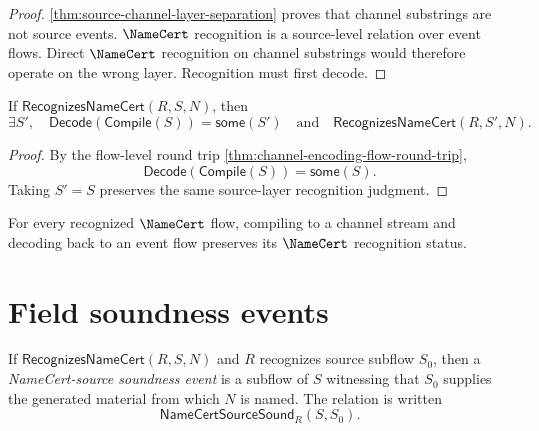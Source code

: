\begin{proof}
\autoref{thm:source-channel-layer-separation} proves that channel substrings are not source events. $\NameCert$ recognition is a source-level relation over event flows. Direct $\NameCert$ recognition on channel substrings would therefore operate on the wrong layer. Recognition must first decode.
\end{proof}

\begin{theorem}
\label{thm:namecert-generated-compilation-preserves-recognition}
If $\mathsf{RecognizesNameCert}(R,S,N)$, then
$$
  \exists S',\quad
  \mathsf{Decode}(\mathsf{Compile}(S)) = \mathsf{some}(S')
  \quad\text{and}\quad
  \mathsf{RecognizesNameCert}(R,S',N).
$$
\end{theorem}

\begin{proof}
By the flow-level round trip \autoref{thm:channel-encoding-flow-round-trip},
$$
  \mathsf{Decode}(\mathsf{Compile}(S))=\mathsf{some}(S).
$$
Taking $S'=S$ preserves the same source-layer recognition judgment.
\end{proof}

\begin{corollary}
\label{cor:namecert-generated-recognition-invariant}
For every recognized $\NameCert$ flow, compiling to a channel stream and decoding back to an event flow preserves its $\NameCert$ recognition status.
\end{corollary}

\section{Field soundness events}
\label{sec:namecert-generated-field-soundness}

\begin{definition}
\label{def:namecert-generated-source-soundness}
If $\mathsf{RecognizesNameCert}(R,S,N)$ and $R$ recognizes source subflow $S_{0}$, then a \emph{NameCert-source soundness event} is a subflow of $S$ witnessing that $S_{0}$ supplies the generated material from which $N$ is named. The relation is written
$$
  \mathsf{NameCertSourceSound}_{R}(S,S_{0}).
$$
\end{definition}

